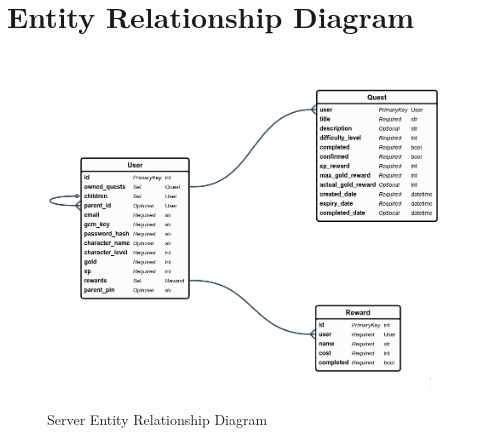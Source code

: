 \chapter{Entity Relationship Diagram}
\label{appendix:erd}

\begin{figure}[ht]
	\centering
	\includegraphics[scale=0.45]{../images/entityRelationshipDiagram.png}
	\caption{Server Entity Relationship Diagram}
	\label{fig:erd}
\end{figure} 